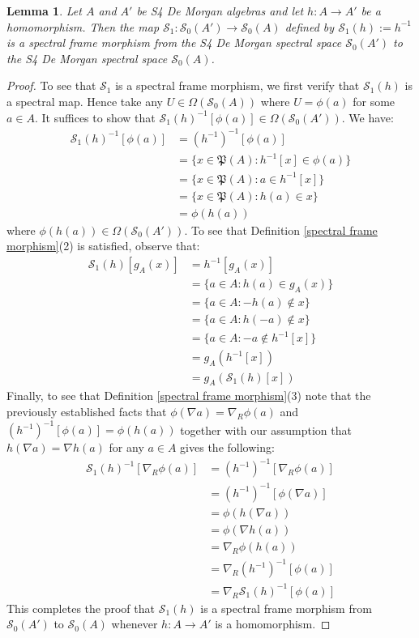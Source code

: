 \documentclass[10pt,a4paper]{amsart}
\newtheorem{lemma}{Lemma}
\begin{document}
\begin{lemma}\label{homo to spec}
    Let $A$ and $A'$ be S4 De Morgan algebras and let $h\colon A\to A'$ be a homomorphism. Then the map $\mathcal{S}_1\colon\mathcal{S}_0(A')\to\mathcal{S}_0(A)$ defined by $\mathcal{S}_1(h):=h^{-1}$ is a spectral frame morphism from the S4 De Morgan spectral space $\mathcal{S}_0(A')$ to the S4 De Morgan spectral space $\mathcal{S}_0(A)$.  
\end{lemma}

\begin{proof}
To see that $\mathcal{S}_1$ is a spectral frame morphism, we first verify that $\mathcal{S}_1(h)$ is a spectral map. Hence take any $U\in\Omega(\mathcal{S}_0(A))$ where $U=\phi(a)$ for some $a\in A$. It suffices to show that $\mathcal{S}_1(h)^{-1}[\phi(a)]\in\Omega(\mathcal{S}_0(A'))$. We have: 
\begin{align*}
    \mathcal{S}_1(h)^{-1}[\phi(a)]&=(h^{-1})^{-1}[\phi(a)]\\&=\{x\in\mathfrak{P}(A):h^{-1}[x]\in\phi(a)\}
    \\&=\{x\in\mathfrak{P}(A):a\in h^{-1}[x]\}
    \\&=\{x\in\mathfrak{P}(A):h(a)\in x\}
    \\&=\phi(h(a))
\end{align*}
where $\phi(h(a))\in\Omega(\mathcal{S}_0(A'))$. To see that Definition \ref{spectral frame morphism}(2) is satisfied, observe that:  
\begin{align*}
    \mathcal{S}_1(h)[g_A(x)]&=h^{-1}[g_A(x)]\\&=\{a\in A:h(a)\in g_A(x)\}
    \\&=\{a\in A:-h(a)\not\in x\}
    \\&=\{a\in A:h(-a)\not\in x\}
    \\&=\{a\in A:-a\not\in h^{-1}[x]\}
    \\&=g_A(h^{-1}[x])
    \\&=g_A(\mathcal{S}_1(h)[x])
\end{align*}
Finally, to see that Definition \ref{spectral frame morphism}(3) note that the previously established facts that $\phi(\nabla a)=\nabla_R\phi(a)$ and $(h^{-1})^{-1}[\phi(a)]=\phi(h(a))$ together with our assumption that $h(\nabla a)=\nabla h(a)$ for any $a\in A$ gives the following: 
\begin{align*}
    \mathcal{S}_1(h)^{-1}[\nabla_R\phi(a)]&=(h^{-1})^{-1}[\nabla_R\phi(a)]
    \\&=(h^{-1})^{-1}[\phi(\nabla a)]
    \\&=\phi(h(\nabla a))
    \\&=\phi(\nabla h(a))
    \\&=\nabla_R\phi(h(a))
    \\&=\nabla_R(h^{-1})^{-1}[\phi(a)]
    \\&=\nabla_R\mathcal{S}_1(h)^{-1}[\phi(a)]
\end{align*}
This completes the proof that $\mathcal{S}_1(h)$ is a spectral frame morphism from $\mathcal{S}_0(A')$ to $\mathcal{S}_0(A)$ whenever $h\colon A\to A'$ is a homomorphism.  
\end{proof}
\end{document}
